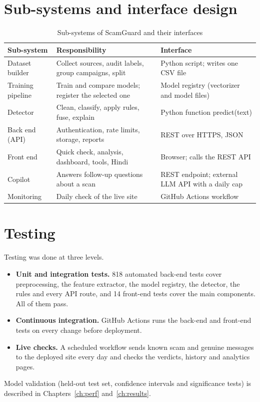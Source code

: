 \documentclass[12pt,a4paper]{report}
\renewcommand{\texttt}[1]{\textrm{#1}}
\begin{document}
\section{Sub-systems and interface design}
\begin{table}[H]
\centering
\caption{Sub-systems of ScamGuard and their interfaces}
\label{tab:subsys}
\begin{tabular}{|L{3.2cm}|L{5.8cm}|L{4.7cm}|}
\hline
\textbf{Sub-system} & \textbf{Responsibility} & \textbf{Interface} \\
\hline
Dataset builder & Collect sources, audit labels, group campaigns, split & Python script; writes one CSV file \\
\hline
Training pipeline & Train and compare models; register the selected one & Model registry (vectorizer and model files) \\
\hline
Detector & Clean, classify, apply rules, fuse, explain & Python function \texttt{predict(text)} \\
\hline
Back end (API) & Authentication, rate limits, storage, reports & REST over HTTPS, JSON \\
\hline
Front end & Quick check, analysis, dashboard, tools, Hindi & Browser; calls the REST API \\
\hline
Copilot & Answers follow-up questions about a scan & REST endpoint; external LLM API with a daily cap \\
\hline
Monitoring & Daily check of the live site & GitHub Actions workflow \\
\hline
\end{tabular}
\end{table}

\section{Testing}
Testing was done at three levels.
\begin{itemize}
\item \textbf{Unit and integration tests.} 818 automated back-end tests cover preprocessing, the feature extractor, the model registry, the detector, the rules and every API route, and 14 front-end tests cover the main components. All of them pass.
\item \textbf{Continuous integration.} GitHub Actions runs the back-end and front-end tests on every change before deployment.
\item \textbf{Live checks.} A scheduled workflow sends known scam and genuine messages to the deployed site every day and checks the verdicts, history and analytics pages.
\end{itemize}
Model validation (held-out test set, confidence intervals and significance tests) is described in Chapters~\ref{ch:perf} and~\ref{ch:results}.
\end{document}
